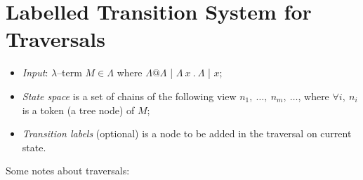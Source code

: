 \documentclass[a4paper, 10pt]{article}
\begin{document}
\section{Labelled Transition System for Traversals}
\begin{itemize}
\item \textit{Input}: $\lambda$--term $M \in \Lambda$ where $\Lambda @ \Lambda$ | $\Lambda\ x\ .\ \Lambda$ | $x$;
\item \textit{State space} is a set of chains of the following view $n_1,\ \dots,\ n_m,\ \dots$, where $\forall i,\ n_i$ is a token (a tree node) of $M$;
\item \textit{Transition labels} (optional) is a node to be added in the traversal on current state.
\end{itemize}

Some notes about traversals:
\end{document}
